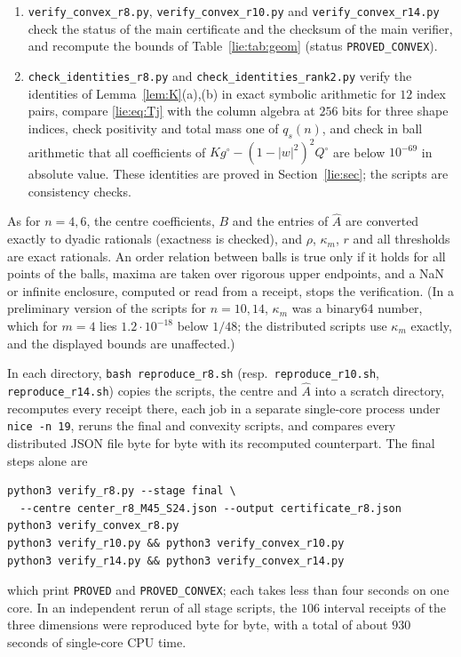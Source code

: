\documentclass[11pt]{amsart}
\theoremstyle{definition}
\theoremstyle{remark}
\numberwithin{equation}{section}
\begin{document}
{\begin{enumerate}[label=(\arabic*)]
\item \texttt{verify\_convex\_r8.py}, \texttt{verify\_convex\_r10.py} and \texttt{verify\_convex\_r14.py} check the status of the main certificate and the checksum of the main verifier, and recompute the bounds of Table~\ref{lie:tab:geom} (status \texttt{PROVED\_CONVEX}).
\item \texttt{check\_identities\_r8.py} and \texttt{check\_identities\_rank2.py} verify the identities of Lemma~\ref{lem:K}(a),(b) in exact symbolic arithmetic for $12$ index pairs, compare \eqref{lie:eq:Tj} with the column algebra at $256$ bits for three shape indices, check positivity and total mass one of $q_s(n)$, and check in ball arithmetic that all coefficients of $Kg^\circ-(1-|w|^2)^2Q^\circ$ are below $10^{-69}$ in absolute value. These identities are proved in Section~\ref{lie:sec}; the scripts are consistency checks.
\end{enumerate}
\par}
As for $n=4,6$, the centre coefficients, $B$ and the entries of $\widehat A$ are converted exactly to dyadic rationals (exactness is checked), and $\rho$, $\kappa_m$, $r$ and all thresholds are exact rationals. An order relation between balls is true only if it holds for all points of the balls, maxima are taken over rigorous upper endpoints, and a NaN or infinite enclosure, computed or read from a receipt, stops the verification. (In a preliminary version of the scripts for $n=10,14$, $\kappa_m$ was a binary64 number, which for $m=4$ lies $1.2\cdot10^{-18}$ below $1/48$; the distributed scripts use $\kappa_m$ exactly, and the displayed bounds are unaffected.)

{\sloppy In each directory, \texttt{bash reproduce\_r8.sh} (resp.\ \texttt{reproduce\_r10.sh}, \texttt{reproduce\_r14.sh}) copies the scripts, the centre and $\widehat A$ into a scratch directory, recomputes every receipt there, each job in a separate single-core process under \texttt{nice -n 19}, reruns the final and convexity scripts, and compares every distributed JSON file byte for byte with its recomputed counterpart. The final steps alone are\par}
\begin{verbatim}
python3 verify_r8.py --stage final \
  --centre center_r8_M45_S24.json --output certificate_r8.json
python3 verify_convex_r8.py
python3 verify_r10.py && python3 verify_convex_r10.py
python3 verify_r14.py && python3 verify_convex_r14.py
\end{verbatim}
which print \texttt{PROVED} and \texttt{PROVED\_CONVEX}; each takes less than four seconds on one core. In an independent rerun of all stage scripts, the $106$ interval receipts of the three dimensions were reproduced byte for byte, with a total of about $930$ seconds of single-core CPU time.
\end{document}
